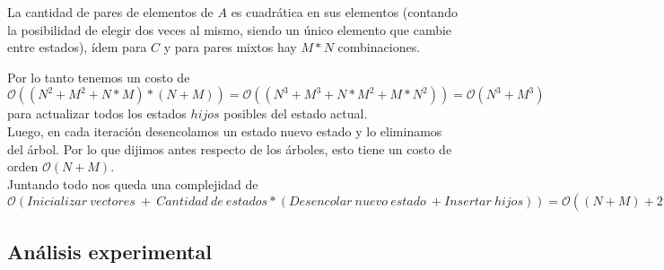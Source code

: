 La cantidad de pares de elementos de $A$ es cuadrática en sus elementos (contando la posibilidad de elegir dos veces al mismo, siendo un único elemento que cambie entre estados), ídem para $C$ y para pares mixtos hay $M*N$ combinaciones.

Por lo tanto tenemos un costo de $\mathcal{O}((N^2+M^2+N*M)*(N+M))=\mathcal{O}((N^3+M^3+N*M^2+M*N^2))=\mathcal{O}(N^3+M^3)$ para actualizar todos los estados $hijos$ posibles del estado actual. \\

Luego, en cada iteración desencolamos un estado nuevo estado y lo eliminamos del árbol. Por lo que dijimos antes respecto de los árboles, esto tiene un costo de orden $\mathcal{O}(N+M)$. \\

Juntando todo nos queda una complejidad de $\mathcal{O}(Inicializar\ vectores\ +\ Cantidad\ de\ estados*(Desencolar\ nuevo\ estado\ + Insertar\ hijos)) = \mathcal{O}((N+M)+2^{N+M}((N+M)+(N^3+M^3))) = \mathcal{O}(\ 2^{N+M}*(N^3+M^3)\ )$

\subsection{Análisis experimental}
